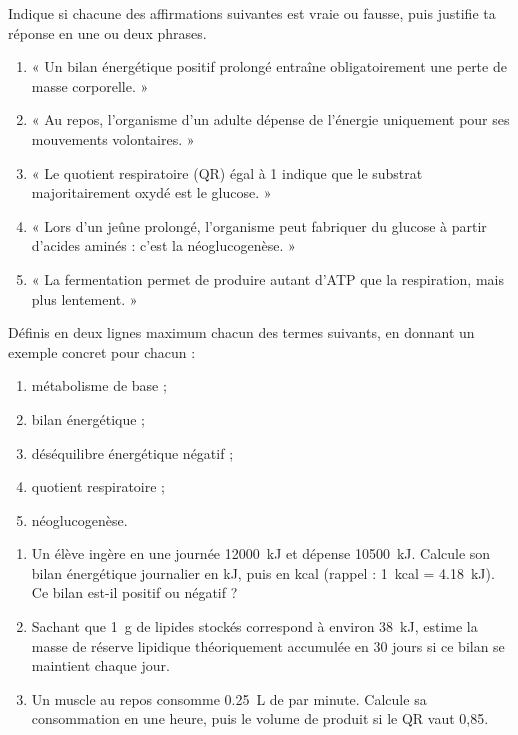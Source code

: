 \documentclass[11pt]{article}
\begin{document}
\begin{exercice}
Indique si chacune des affirmations suivantes est vraie ou fausse, puis justifie ta réponse en une ou deux phrases.
\begin{enumerate}
\item « Un bilan énergétique positif prolongé entraîne obligatoirement une perte de masse corporelle. »
\item « Au repos, l'organisme d'un adulte dépense de l'énergie uniquement pour ses mouvements volontaires. »
\item « Le quotient respiratoire (QR) égal à 1 indique que le substrat majoritairement oxydé est le glucose. »
\item « Lors d'un jeûne prolongé, l'organisme peut fabriquer du glucose à partir d'acides aminés : c'est la néoglucogenèse. »
\item « La fermentation permet de produire autant d'ATP que la respiration, mais plus lentement. »
\end{enumerate}
\end{exercice}

\begin{exercice}
Définis en deux lignes maximum chacun des termes suivants, en donnant un exemple concret pour chacun :
\begin{enumerate}
\item métabolisme de base ;
\item bilan énergétique ;
\item déséquilibre énergétique négatif ;
\item quotient respiratoire ;
\item néoglucogenèse.
\end{enumerate}
\end{exercice}

\begin{exercice}
\begin{enumerate}
\item Un élève ingère en une journée \SI{12000}{kJ} et dépense \SI{10500}{kJ}. Calcule son bilan énergétique journalier en kJ, puis en kcal (rappel : \SI{1}{kcal} = \SI{4,18}{kJ}). Ce bilan est-il positif ou négatif ?
\item Sachant que \SI{1}{g} de lipides stockés correspond à environ \SI{38}{kJ}, estime la masse de réserve lipidique théoriquement accumulée en 30 jours si ce bilan se maintient chaque jour.
\item Un muscle au repos consomme \SI{0,25}{L} de  par minute. Calcule sa consommation en une heure, puis le volume de  produit si le QR vaut 0,85.
\end{enumerate}
\end{exercice}
\end{document}
